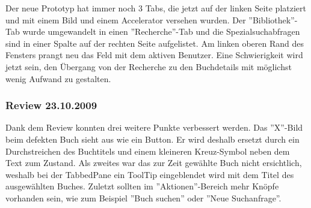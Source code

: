 \documentclass[10pt, a4paper]{scrartcl}
\begin{document}
Der neue Prototyp hat immer noch 3 Tabs, die jetzt auf der linken Seite platziert und mit einem Bild und einem Accelerator versehen wurden. Der ''Bibliothek''-Tab wurde umgewandelt in einen ''Recherche''-Tab und die Spezialsuchabfragen sind in einer Spalte auf der rechten Seite aufgelistet. Am linken oberen Rand des Fensters prangt neu das Feld mit dem aktiven Benutzer. Eine Schwierigkeit wird jetzt sein, den Übergang von der Recherche zu den Buchdetails mit möglichst wenig Aufwand zu gestalten.

\subsubsection{Review 23.10.2009}
Dank dem Review konnten drei weitere Punkte verbessert werden. Das ''X''-Bild beim defekten Buch sieht aus wie ein Button. Er wird deshalb ersetzt durch ein Durchstreichen des Buchtitels und einem kleineren Kreuz-Symbol neben dem Text zum Zustand. Als zweites war das zur Zeit gewählte Buch nicht ersichtlich, weshalb bei der TabbedPane ein ToolTip eingeblendet wird mit dem Titel des ausgewählten Buches. Zuletzt sollten im ''Aktionen''-Bereich mehr Knöpfe vorhanden sein, wie zum Beispiel ''Buch suchen'' oder ''Neue Suchanfrage''.
\end{document}
